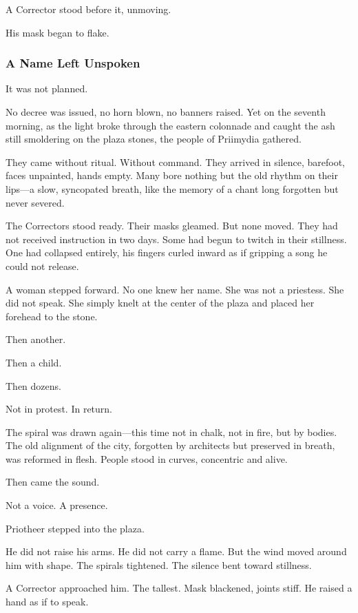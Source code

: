\documentclass[12pt]{article}
\begin{document}
A Corrector stood before it, unmoving.

His mask began to flake.

\dotfill

\subsubsection{A Name Left Unspoken}

It was not planned.

No decree was issued, no horn blown, no banners raised. Yet on the seventh morning, as the light broke through the eastern colonnade and caught the ash still smoldering on the plaza stones, the people of Priimydia gathered.

They came without ritual. Without command. They arrived in silence, barefoot, faces unpainted, hands empty. Many bore nothing but the old rhythm on their lips—a slow, syncopated breath, like the memory of a chant long forgotten but never severed.

The Correctors stood ready. Their masks gleamed. But none moved. They had not received instruction in two days. Some had begun to twitch in their stillness. One had collapsed entirely, his fingers curled inward as if gripping a song he could not release.

A woman stepped forward. No one knew her name. She was not a priestess. She did not speak. She simply knelt at the center of the plaza and placed her forehead to the stone.

Then another.

Then a child.

Then dozens.

Not in protest. In return.

The spiral was drawn again—this time not in chalk, not in fire, but by bodies. The old alignment of the city, forgotten by architects but preserved in breath, was reformed in flesh. People stood in curves, concentric and alive.

Then came the sound.

Not a voice. A presence.

Priotheer stepped into the plaza.

He did not raise his arms. He did not carry a flame. But the wind moved around him with shape. The spirals tightened. The silence bent toward stillness.

A Corrector approached him. The tallest. Mask blackened, joints stiff. He raised a hand as if to speak.
\end{document}

